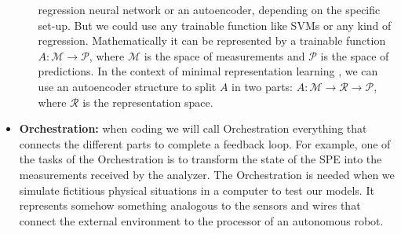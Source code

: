 \documentclass[11pt,a4paper,twoside]{report}
\newcommand{\+}{\textnormal{+} }
\theoremstyle{definition}
\numberwithin{equation}{chapter}
\begin{document}
\begin{itemize}
\begin{itemize}
        regression neural network or an autoencoder, depending on the specific
        set-up. But we could use any trainable function like SVMs or any kind of
        regression. Mathematically it can be represented by a trainable function
        $ A :\mathcal{M} \rightarrow \mathcal{P}$, where $\mathcal{M}$ is the
        space of measurements and $\mathcal{P}$ is the space of predictions. In
        the context of minimal representation learning
        \cite{iten2020discovering}, we can use an autoencoder structure to split
        $A$ in two parts: $A:\mathcal{M} \rightarrow \mathcal{R}\rightarrow
        \mathcal{P}$, where $\mathcal{R}$ is the representation space.
  \end{itemize}
    \item \textbf{Orchestration:} when coding we will call Orchestration
    everything that connects the different parts to complete a feedback loop.
    For example, one of the tasks of the Orchestration is to transform the state
    of the SPE into the measurements received by the analyzer. The Orchestration
    is needed when we simulate fictitious physical situations in a computer to
    test our models. It represents somehow something analogous to the sensors
    and wires that connect the external environment to the processor of an
    autonomous robot.
\end{itemize}
\end{document}
